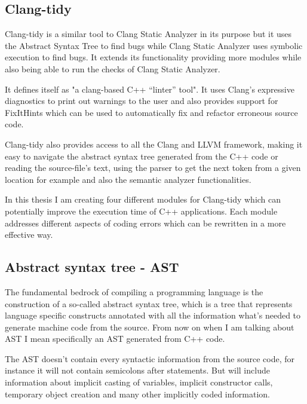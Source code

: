 \subsection{Clang-tidy}
\par Clang-tidy is a similar tool to Clang Static Analyzer in its purpose but it uses the Abstract Syntax Tree to find bugs while Clang Static Analyzer uses symbolic execution to find bugs. It extends its functionality providing more modules while also being able to run the checks of Clang Static Analyzer. \medskip
\par It defines itself as "a clang-based C++ “linter” tool"\cite{clang_tidy_mainpage}. It uses Clang's expressive diagnostics to print out warnings to the user and also provides support for FixItHints which can be used to automatically fix and refactor erroneous source code. \medskip
\par Clang-tidy also provides access to all the Clang and LLVM framework, making it easy to navigate the abstract syntax tree generated from the C++ code or reading the source-file's text, using the parser to get the next token from a given location for example and also the semantic analyzer functionalities.\medskip
\par In this thesis I am creating four different modules for Clang-tidy which can potentially improve the execution time of C++ applications. Each module addresses different aspects of coding errors which can be rewritten in a more effective way. 
\subsection{Abstract syntax tree - AST}
\par The fundamental bedrock of compiling a programming language is the construction of a so-called abstract syntax tree, which is a tree that represents language specific constructs annotated with all the information what's needed to generate machine code from the source. From now on when I am talking about AST I mean specifically an AST generated from C++ code. \medskip
\par The AST doesn't contain every syntactic information from the source code, for instance it will not contain semicolons after statements. But will include information about implicit casting of variables, implicit constructor calls, temporary object creation and many other implicitly coded information. 

